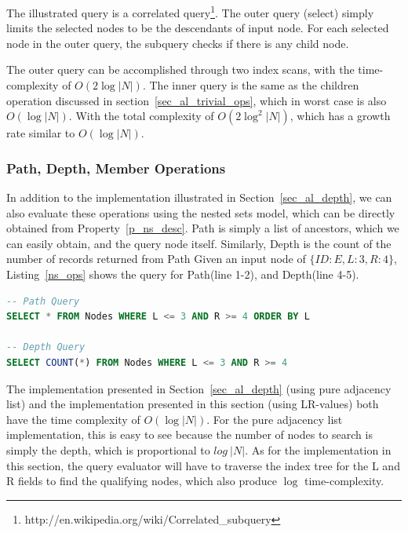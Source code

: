 The illustrated query is a correlated query\footnote{http://en.wikipedia.org/wiki/Correlated\_subquery}. The outer query (select) simply limits the selected nodes to be the descendants of input node. For each selected node in the outer query, the subquery checks if there is any child node.

The outer query can be accomplished through two index scans, with the time-complexity of $O(2\log |N|)$. The inner query is the same as the children operation discussed in section~\ref{sec_al_trivial_ops}, which in worst case is also $O(\log |N|)$. With the total complexity of $O(2\log^2 |N|)$, which has a growth rate similar to $O(\log |N|)$.


\subsubsection{Path, Depth, Member Operations}

In addition to the implementation illustrated in Section~\ref{sec_al_depth}, we can also evaluate these operations using the nested sets model, which can be directly obtained from Property~\ref{p_ns_desc}. Path is simply a list of ancestors, which we can easily obtain, and the query node itself. Similarly, Depth is the count of the number of records returned from Path Given an input node of $\{ID:E, L:3, R:4\}$, Listing~\ref{ns_ops} shows the query for Path(line 1-2), and Depth(line 4-5).

\begin{lstlisting}[language=sql,caption={Path, Depth, Member Operations},label=ns_ops, float]
-- Path Query
SELECT * FROM Nodes WHERE L <= 3 AND R >= 4 ORDER BY L

-- Depth Query
SELECT COUNT(*) FROM Nodes WHERE L <= 3 AND R >= 4
\end{lstlisting}

The implementation presented in Section~\ref{sec_al_depth} (using pure adjacency list) and the implementation presented in this section (using LR-values) both have the time complexity of $O(\log |N|)$. For the pure adjacency list implementation, this is easy to see because the number of nodes to search is simply the depth, which is proportional to $log\ |N|$.  As for the implementation in this section, the query evaluator will have to traverse the index tree for the L and R fields to find the qualifying nodes, which also produce $\log$ time-complexity.

